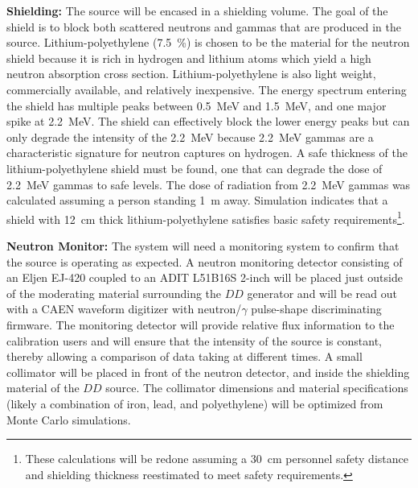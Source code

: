 {\bf Shielding:} The source will be encased in a shielding volume. The goal of the shield is to block both scattered neutrons and gammas that are produced in the source. Lithium-polyethylene (\SI{7.5}{\%}) is chosen to be the material for the neutron shield because it is rich in hydrogen and lithium atoms which yield a high neutron absorption cross section. Lithium-polyethylene is also light weight, commercially available, and relatively inexpensive. The energy spectrum entering the shield has multiple peaks between \SI{0.5}{\MeV} and \SI{1.5}{\MeV}, and one major spike at \SI{2.2}{\MeV}. The shield can effectively block the lower energy peaks but can only degrade the intensity of the \SI{2.2}{\MeV} because \SI{2.2}{\MeV} gammas are a characteristic signature for neutron captures on hydrogen. A safe thickness of the lithium-polyethylene shield must be found, one that can degrade the dose of \SI{2.2}{\MeV} gammas to safe levels. The dose of radiation from \SI{2.2}{\MeV} gammas was calculated assuming a person standing \SI{1}{\m} away. Simulation indicates that a shield with \SI{12}{\cm} thick lithium-polyethylene satisfies basic safety requirements\footnote{These calculations will be redone assuming a \SI{30}{\cm} personnel safety distance and shielding thickness reestimated to meet  safety requirements.}. 

 
{\bf Neutron Monitor:} The system will need a monitoring system to confirm that the source is operating as expected.  A neutron monitoring detector consisting of an Eljen EJ-420 coupled to an ADIT L51B16S \num{2}-inch  will be placed just outside of the moderating material surrounding the $DD$ generator and will be read out with a CAEN waveform digitizer with neutron/$\gamma$ pulse-shape discriminating firmware. The monitoring detector will provide relative flux information to the calibration users and will ensure that the intensity of the source is constant, thereby allowing a comparison of data taking at different times.  A small collimator will be placed in front of the neutron detector, and inside the shielding material of the $DD$ source. The collimator dimensions and material specifications (likely a combination of iron, lead, and polyethylene) will be optimized from Monte Carlo simulations.

